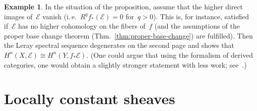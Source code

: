 \documentclass[10pt]{amsart}
\makeatletter
\theoremstyle{definition}
\newtheorem{ex}[defn]{Example}
\theoremstyle{plain}
\theoremstyle{remark}
\newcommand{\E}{\mathcal{E}}
\newcommand{\ie}{i.\,e.\@\xspace}
\makeatother
\begin{document}
\begin{ex}In the situation of the proposition, assume that the higher direct
images of~$\E$ vanish (\ie~$R^q f_*(\E) = 0$ for~$q > 0$). This is, for
instance, satisfied if~$\E$ has no higher cohomology on the fibers of~$f$ (and
the assumptions of the proper base change theorem
(Thm.~\ref{thm:proper-base-change}) are fulfilled). Then the Leray spectral
sequence degenerates on the second page and shows that~$H^n(X,\E) \cong
H^n(Y,f_*\E)$. (One could argue that using the formalism of derived categories,
one would obtain a slightly stronger statement with less work;
see~\cite{mo:derived-functors}.)
\end{ex}


\section*{Locally constant sheaves}
\end{document}
